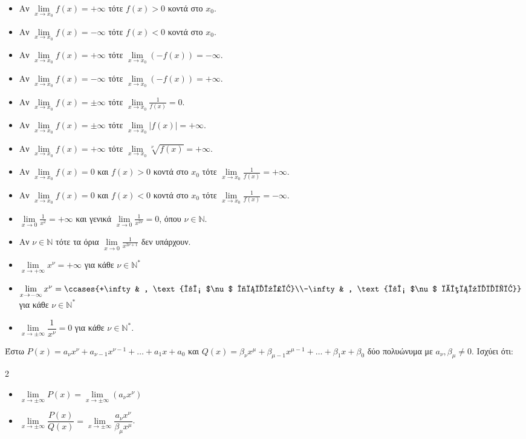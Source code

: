 \vspace{-5mm}
\begin{itemize}
\item Αν $\lim\limits_{x\to x_0}{f(x)}=+\infty$ τότε $f(x)>0$ κοντά στο $x_0$.
\item Αν $\lim\limits_{x\to x_0}{f(x)}=-\infty$ τότε $f(x)<0$ κοντά στο $x_0$.
\item Αν $\lim\limits_{x\to x_0}{f(x)}=+\infty$ τότε $\lim\limits_{x\to x_0}{(-f(x))}=-\infty$.
\item Αν $\lim\limits_{x\to x_0}{f(x)}=-\infty$ τότε $\lim\limits_{x\to x_0}{(-f(x))}=+\infty$.
\item Αν $\lim\limits_{x\to x_0}{f(x)}=\pm\infty$ τότε $\lim\limits_{x\to x_0}{\frac{1}{f(x)}}=0$.
\item Αν $\lim\limits_{x\to x_0}{f(x)}=\pm\infty$ τότε $\lim\limits_{x\to x_0}{|f(x)|}=+\infty$.
\item Αν $\lim\limits_{x\to x_0}{f(x)}=+\infty$ τότε $\lim\limits_{x\to x_0}{\sqrt[\nu]{f(x)}}=+\infty$.
\item Αν $\lim\limits_{x\to x_0}{f(x)}=0$ και $f(x)>0$ κοντά στο $x_0$ τότε $\lim\limits_{x\to x_0}{\frac{1}{f(x)}}=+\infty$.
\item Αν $\lim\limits_{x\to x_0}{f(x)}=0$ και $f(x)<0$ κοντά στο $x_0$ τότε $\lim\limits_{x\to x_0}{\frac{1}{f(x)}}=-\infty$.
\item $\lim\limits_{x\to 0}{\frac{1}{x^2}}=+\infty$ και γενικά $\lim\limits_{x\to 0}{\frac{1}{x^{2\nu}}}=0$, όπου $\nu\in\mathbb{N}$.
\item Αν $\nu\in\mathbb{N}$ τότε τα όρια $\lim\limits_{x\to 0}{\frac{1}{x^{2\nu+1}}}$ δεν υπάρχουν.
\end{itemize}

\begin{itemize}
\item $\lim\limits_{x\to +\infty}{x^{\nu}}=+\infty$ για κάθε $\nu\in\mathbb{N}^*$
\item $\lim\limits_{x\to -\infty}{x^{\nu}}=\ccases{+\infty & , \text{αν $\nu$ άρτιος}\\-\infty & , \text{αν $\nu$ περιττός}}$ για κάθε $\nu\in\mathbb{N}^*$
\item $\lim\limits_{x\to \pm\infty}{\dfrac{1}{x^{\nu}}}=0$ για κάθε $\nu\in\mathbb{N}^*$.
\end{itemize}

Έστω $P(x)=a_{\nu}x^{\nu}+a_{\nu-1}x^{\nu-1}+\ldots+a_1x+a_0$ και $Q(x)=\beta_{\nu}x^{\mu}+\beta_{\mu-1}x^{\mu-1}+\ldots+\beta_1x+\beta_0$ δύο πολυώνυμα με $a_\nu,\beta_\mu\neq 0$. Ισχύει ότι:
\begin{multicols}{2}
\begin{itemize}
\item $\lim\limits_{x\to\pm\infty}{P(x)}=\lim\limits_{x\to\pm\infty}{\left(a_{\nu}x^{\nu}\right)}$
\item $\lim\limits_{x\to \pm\infty}{\dfrac{P(x)}{Q(x)}}=\lim\limits_{x\to\pm\infty}{\dfrac{a_{\nu}x^{\nu}}{\beta_{\mu}x^{\mu}}}$.
\end{itemize}
\end{multicols}

